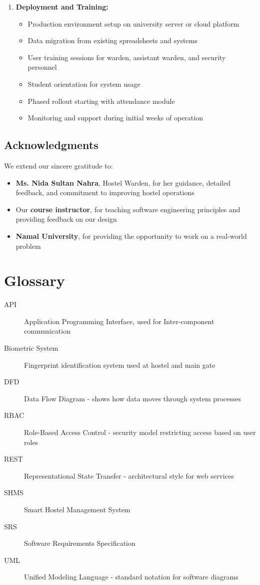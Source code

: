 \documentclass[12pt]{article}
\begin{document}
\begin{enumerate}
\item \textbf{Deployment and Training:}
\begin{itemize}
\item Production environment setup on university server or cloud platform
\item Data migration from existing spreadsheets and systems
\item User training sessions for warden, assistant warden, and security personnel
\item Student orientation for system usage
\item Phased rollout starting with attendance module
\item Monitoring and support during initial weeks of operation
\end{itemize}
\end{enumerate}

\subsection{Acknowledgments}

We extend our sincere gratitude to:

\begin{itemize}
\item \textbf{Ms. Nida Sultan Nahra}, Hostel Warden, for her guidance, detailed feedback, and commitment to improving hostel operations
\item Our \textbf{course instructor}, for teaching software engineering principles and providing feedback on our design
\item \textbf{Namal University}, for providing the opportunity to work on a real-world problem
\end{itemize}

\newpage
\appendix

\section{Glossary}

\begin{description}
    \item[API] Application Programming Interface, used for Inter-component communication
    \item[Biometric System] Fingerprint identification system used at hostel and main gate
    \item[DFD] Data Flow Diagram - shows how data moves through system processes
    \item[RBAC] Role-Based Access Control - security model restricting access based on user roles
    \item[REST] Representational State Transfer - architectural style for web services
    \item[SHMS] Smart Hostel Management System
    \item[SRS] Software Requirements Specification
    \item[UML] Unified Modeling Language - standard notation for software diagrams
\end{description}
\end{document}
